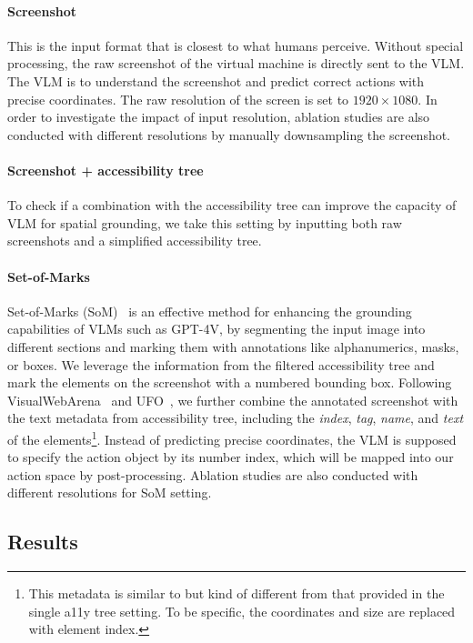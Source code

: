 \paragraph{Screenshot}
This is the input format that is closest to what humans perceive.
Without special processing, the raw screenshot of the 
virtual machine is directly sent to the VLM. The VLM is to 
understand the screenshot and predict
correct actions with precise coordinates. 
The raw resolution of the screen is set to $1920\times 1080$. 
In order to investigate the impact of input resolution, ablation studies are also conducted with different resolutions by manually downsampling the screenshot.

\paragraph{Screenshot + accessibility tree}
To check if a combination with the accessibility tree can improve the capacity of VLM for spatial grounding, we take this setting by inputting both raw screenshots and a simplified accessibility tree.

\paragraph{Set-of-Marks}
Set-of-Marks (SoM)~\citep{yang2023set} is an effective method for enhancing the grounding capabilities of VLMs such as GPT-4V, by segmenting the input image into different sections and marking them with annotations like alphanumerics, masks, or boxes.
We leverage the information from the filtered accessibility tree and mark the 
elements on the screenshot with a numbered bounding box.
Following VisualWebArena~\citep{Koh2024VisualWebArenaEM} and 
UFO~\citep{Zhang2024UFOAU}, we further combine
the annotated screenshot with the text metadata from accessibility tree, including
the \textit{index}, \textit{tag}, \textit{name}, and \textit{text} of the 
elements\footnote{This metadata is similar to but kind of different from that provided in
the single a11y tree setting. To be specific, the coordinates and size are replaced with element
index.}.
Instead of predicting precise coordinates, the VLM is supposed to specify
the action object by its number index, which will be 
mapped into our action space by post-processing. Ablation studies are also
conducted with different resolutions for SoM setting.

\subsection{Results}
\label{result-analysis}
\vspace{-10pt}
